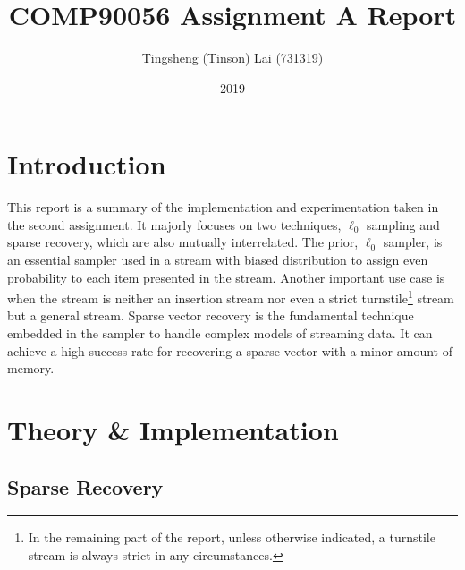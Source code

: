 \documentclass[a4paper, 11pt]{article}
\title{\textbf{COMP90056 Assignment A Report}}
\author{Tingsheng (Tinson) Lai (731319)}
\date{2019}
\begin{document}
    \maketitle
    \section{Introduction}
        This report is a summary of the implementation and experimentation taken in the second assignment. It majorly focuses on two techniques, $\ell_{0}$ sampling and sparse recovery, which are also mutually interrelated. The prior, $\ell_{0}$ sampler, is an essential sampler used in a stream with biased distribution to assign even probability to each item presented in the stream. Another important use case is when the stream is neither an insertion stream nor even a strict turnstile\footnote{In the remaining part of the report, unless otherwise indicated, a turnstile stream is always strict in any circumstances.} stream but a general stream. Sparse vector recovery is the fundamental technique embedded in the sampler to handle complex models of streaming data. It can achieve a high success rate for recovering a sparse vector with a minor amount of memory.
    \section{Theory \& Implementation}
        \subsection{Sparse Recovery}
\end{document}
